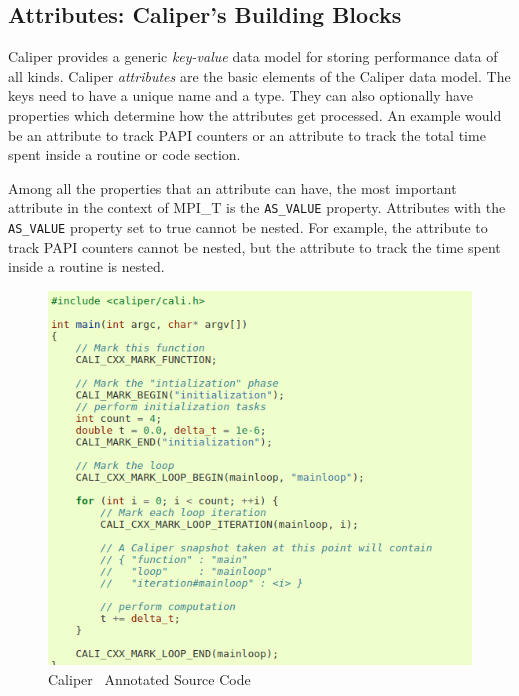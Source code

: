 \subsection{Attributes: Caliper's Building Blocks}
Caliper provides a generic \textit{key-value} data model for storing performance data of all kinds. Caliper \textit{attributes} are the basic elements of the Caliper data model. The keys need to have a unique name and a type. They can also optionally have properties which determine how the attributes get processed. An example would be an attribute to track PAPI counters or an attribute to track the total time spent inside a routine or code section. 
\par Among all the properties that an attribute can have, the most important attribute in the context of MPI\_T is the \verb+AS_VALUE+ property. Attributes with the \verb+AS_VALUE+ property set to true cannot be nested. For example, the attribute to track PAPI counters cannot be nested, but the attribute to track the time spent inside a routine is nested.
\begin{center}
	\begin{figure}[tbp!]
         \centering
  \captionsetup{justification=centering}
		\includegraphics[scale=0.3, width=\columnwidth, keepaspectratio]{figures/cali-example}
		\caption{Caliper~\cite{CALIPER} Annotated Source Code}
		\label{fig:caliexample}
	\end{figure}
\end{center}

